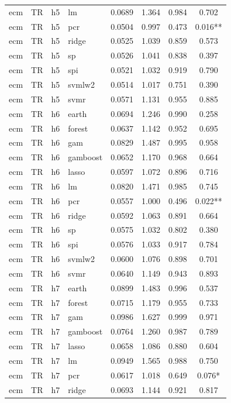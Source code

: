 \begin{ThreePartTable}
\begin{longtable}[t]{llclcccc}
ecm & TR & h5 & lm & 0.0689 & 1.364 & 0.984 & 0.702\\
ecm & TR & h5 & pcr & 0.0504 & 0.997 & 0.473 & 0.016**\\
ecm & TR & h5 & ridge & 0.0525 & 1.039 & 0.859 & 0.573\\
ecm & TR & h5 & sp & 0.0526 & 1.041 & 0.838 & 0.397\\
ecm & TR & h5 & spi & 0.0521 & 1.032 & 0.919 & 0.790\\
ecm & TR & h5 & svmlw2 & 0.0514 & 1.017 & 0.751 & 0.390\\
ecm & TR & h5 & svmr & 0.0571 & 1.131 & 0.955 & 0.885\\
\addlinespace
ecm & TR & h6 & earth & 0.0694 & 1.246 & 0.990 & 0.258\\
ecm & TR & h6 & forest & 0.0637 & 1.142 & 0.952 & 0.695\\
ecm & TR & h6 & gam & 0.0829 & 1.487 & 0.995 & 0.958\\
ecm & TR & h6 & gamboost & 0.0652 & 1.170 & 0.968 & 0.664\\
ecm & TR & h6 & lasso & 0.0597 & 1.072 & 0.896 & 0.716\\
ecm & TR & h6 & lm & 0.0820 & 1.471 & 0.985 & 0.745\\
ecm & TR & h6 & pcr & 0.0557 & 1.000 & 0.496 & 0.022**\\
ecm & TR & h6 & ridge & 0.0592 & 1.063 & 0.891 & 0.664\\
ecm & TR & h6 & sp & 0.0575 & 1.032 & 0.802 & 0.380\\
ecm & TR & h6 & spi & 0.0576 & 1.033 & 0.917 & 0.784\\
ecm & TR & h6 & svmlw2 & 0.0600 & 1.076 & 0.898 & 0.701\\
ecm & TR & h6 & svmr & 0.0640 & 1.149 & 0.943 & 0.893\\
\addlinespace
ecm & TR & h7 & earth & 0.0899 & 1.483 & 0.996 & 0.537\\
ecm & TR & h7 & forest & 0.0715 & 1.179 & 0.955 & 0.733\\
ecm & TR & h7 & gam & 0.0986 & 1.627 & 0.999 & 0.971\\
ecm & TR & h7 & gamboost & 0.0764 & 1.260 & 0.987 & 0.789\\
ecm & TR & h7 & lasso & 0.0658 & 1.086 & 0.880 & 0.604\\
ecm & TR & h7 & lm & 0.0949 & 1.565 & 0.988 & 0.750\\
ecm & TR & h7 & pcr & 0.0617 & 1.018 & 0.649 & 0.076*\\
ecm & TR & h7 & ridge & 0.0693 & 1.144 & 0.921 & 0.817\\

\end{longtable}
\end{ThreePartTable}
